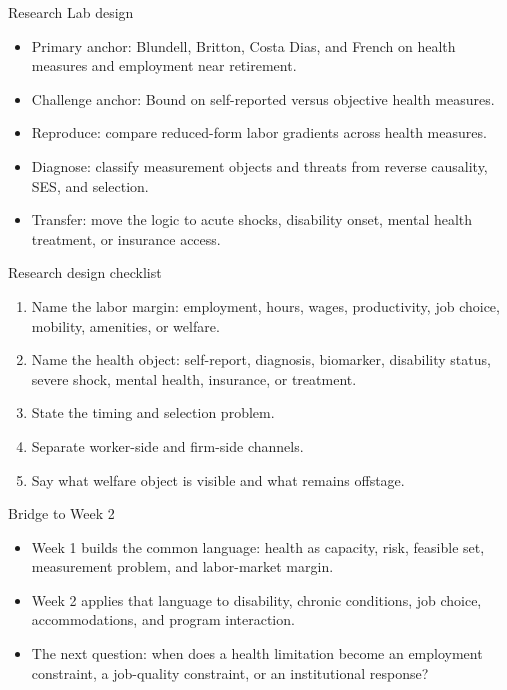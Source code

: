 \documentclass[aspectratio=169,11pt]{beamer}
\begin{document}
\begin{frame}{Research Lab design}
\begin{itemize}
    \item Primary anchor: Blundell, Britton, Costa Dias, and French on health measures and employment near retirement.
    \item Challenge anchor: Bound on self-reported versus objective health measures.
    \item Reproduce: compare reduced-form labor gradients across health measures.
    \item Diagnose: classify measurement objects and threats from reverse causality, SES, and selection.
    \item Transfer: move the logic to acute shocks, disability onset, mental health treatment, or insurance access.
\end{itemize}
\end{frame}

\begin{frame}{Research design checklist}
\begin{enumerate}
    \item Name the labor margin: employment, hours, wages, productivity, job choice, mobility, amenities, or welfare.
    \item Name the health object: self-report, diagnosis, biomarker, disability status, severe shock, mental health, insurance, or treatment.
    \item State the timing and selection problem.
    \item Separate worker-side and firm-side channels.
    \item Say what welfare object is visible and what remains offstage.
\end{enumerate}
\end{frame}

\begin{frame}{Bridge to Week 2}
\begin{itemize}
    \item Week 1 builds the common language: health as capacity, risk, feasible set, measurement problem, and labor-market margin.
    \item Week 2 applies that language to disability, chronic conditions, job choice, accommodations, and program interaction.
    \item The next question: when does a health limitation become an employment constraint, a job-quality constraint, or an institutional response?
\end{itemize}
\end{frame}
\end{document}
